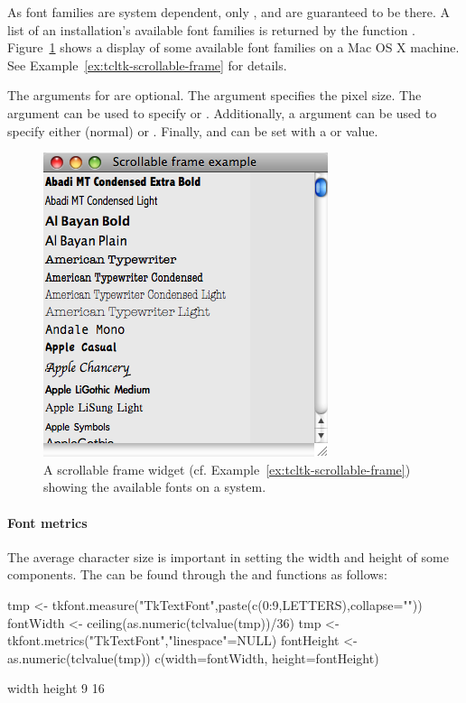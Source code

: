 As font families are system dependent, only ,
 and  are guaranteed to be there. A list
of an installation's available font families is returned by the
function .
Figure~\ref{fig:fig-tcltk-all-fonts} shows a display of some available
font families on a Mac OS X machine.  See
Example~\ref{ex:tcltk-scrollable-frame} for details.

The arguments for  are optional. The
 argument specifies the pixel size. The
 argument can be used to specify
 or .  Additionally, a
 argument can be used to specify either
 (normal) or . Finally,
 and
 can be set with a  or
 value.


\begin{figure}
  \centering
  \includegraphics[width=.6\textwidth]{fig-tcltk-all-fonts.png}
  \caption{A scrollable frame widget (cf. Example~\ref{ex:tcltk-scrollable-frame}) showing the available fonts on a system.}
  \label{fig:fig-tcltk-all-fonts}
\end{figure}


\paragraph{Font metrics}
The average character size is important in setting the width and
height of some components. The can be found through the
 and  functions as
follows:
\begin{Schunk}
\begin{Sinput}
 tmp <- tkfont.measure("TkTextFont",paste(c(0:9,LETTERS),collapse=""))
 fontWidth <- ceiling(as.numeric(tclvalue(tmp))/36)
 tmp <- tkfont.metrics("TkTextFont","linespace"=NULL)
 fontHeight <- as.numeric(tclvalue(tmp))
 c(width=fontWidth, height=fontHeight)
\end{Sinput}
\begin{Soutput}
 width height 
     9     16 
\end{Soutput}
\end{Schunk}


